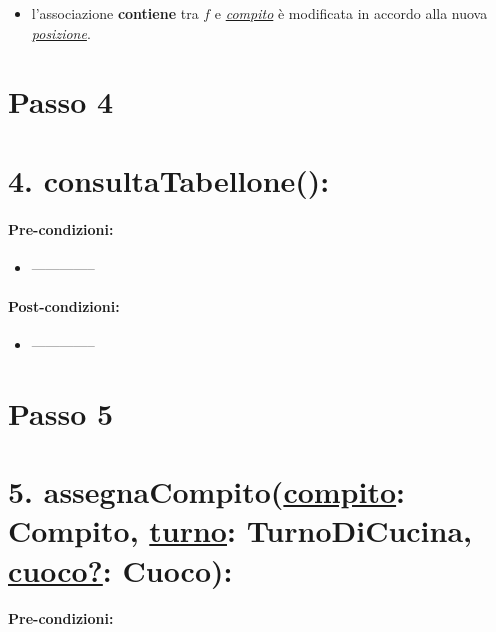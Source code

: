 \begin{itemize}
  \item l'associazione \textbf{contiene} tra $f$ e \underline{\textit{compito}} è modificata in accordo alla nuova \underline{\textit{posizione}}.
\end{itemize}

\section{Passo 4}

\section*{4. consultaTabellone():}

\paragraph{Pre-condizioni:}

\begin{itemize}
  \item --------------
\end{itemize}

\paragraph{Post-condizioni:}

\begin{itemize}
  \item --------------
\end{itemize}


\section{Passo 5}

\section*{5. assegnaCompito(\underline{compito}: Compito, \underline{turno}: TurnoDiCucina, \underline{cuoco?}: Cuoco):}

\paragraph{Pre-condizioni:}

